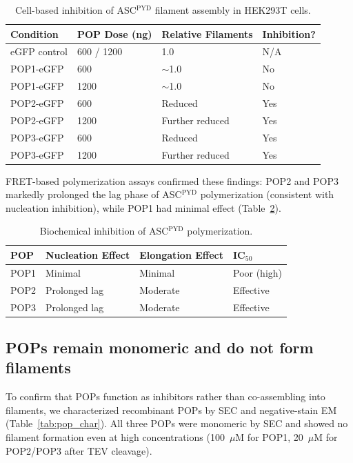 \documentclass[11pt,a4paper]{article}
\begin{document}
\begin{table}[htbp]
\centering
\caption{Cell-based inhibition of ASC$^{\text{PYD}}$ filament assembly in HEK293T cells.}
\label{tab:asc_cell}
\begin{tabular}{llll}
\toprule
\textbf{Condition} & \textbf{POP Dose (ng)} & \textbf{Relative Filaments} & \textbf{Inhibition?} \\
\midrule
eGFP control & 600 / 1200 & 1.0 & N/A \\
POP1-eGFP & 600 & $\sim$1.0 & No \\
POP1-eGFP & 1200 & $\sim$1.0 & No \\
POP2-eGFP & 600 & Reduced & Yes \\
POP2-eGFP & 1200 & Further reduced & Yes \\
POP3-eGFP & 600 & Reduced & Yes \\
POP3-eGFP & 1200 & Further reduced & Yes \\
\bottomrule
\end{tabular}
\end{table}

FRET-based polymerization assays confirmed these findings: POP2 and POP3 markedly prolonged the lag phase of ASC$^{\text{PYD}}$ polymerization (consistent with nucleation inhibition), while POP1 had minimal effect (Table~\ref{tab:asc_fret}).

\begin{table}[htbp]
\centering
\caption{Biochemical inhibition of ASC$^{\text{PYD}}$ polymerization.}
\label{tab:asc_fret}
\begin{tabular}{llll}
\toprule
\textbf{POP} & \textbf{Nucleation Effect} & \textbf{Elongation Effect} & \textbf{IC$_{50}$} \\
\midrule
POP1 & Minimal & Minimal & Poor (high) \\
POP2 & Prolonged lag & Moderate & Effective \\
POP3 & Prolonged lag & Moderate & Effective \\
\bottomrule
\end{tabular}
\end{table}

\subsection{POPs remain monomeric and do not form filaments}

To confirm that POPs function as inhibitors rather than co-assembling into filaments, we characterized recombinant POPs by SEC and negative-stain EM (Table~\ref{tab:pop_char}). All three POPs were monomeric by SEC and showed no filament formation even at high concentrations (100~$\mu$M for POP1, 20~$\mu$M for POP2/POP3 after TEV cleavage).
\end{document}
